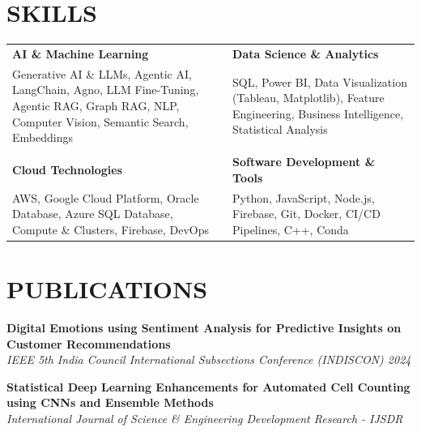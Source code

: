 \documentclass[a4paper,11pt]{article}
\newcommand{\safehref}[2]{#2}
\let\href\safehref
\newcommand{\extlink}{\raisebox{0.2ex}{\scriptsize\faExternalLink*}}
\begin{document}
\section*{SKILLS}
\setlength{\tabcolsep}{10pt}
\renewcommand{\arraystretch}{1.0}
\begin{tabularx}{\textwidth}{@{}>{\RaggedRight\arraybackslash}X >{\RaggedRight\arraybackslash}X@{}}
  \textbf{AI \& Machine Learning} & \textbf{Data Science \& Analytics} \\
  Generative AI \& LLMs, Agentic AI, LangChain, Agno, LLM Fine-Tuning, Agentic RAG, Graph RAG, NLP, Computer Vision, Semantic Search, Embeddings &
  SQL, Power BI, Data Visualization (Tableau, Matplotlib), Feature Engineering, Business Intelligence, Statistical Analysis \\
  \\[-3pt]
  \textbf{Cloud Technologies} & \textbf{Software Development \& Tools} \\
  AWS, Google Cloud Platform, Oracle Database, Azure SQL Database, Compute \& Clusters, Firebase, DevOps &
  Python, JavaScript, Node.js, Firebase, Git, Docker, CI/CD Pipelines, C++, Conda \\
\end{tabularx}

\section*{PUBLICATIONS}
\sloppy
\noindent\textbf{\href{https://example.com}{Digital Emotions using Sentiment Analysis for Predictive Insights on Customer Recommendations\ \extlink}}\\
\textit{IEEE 5th India Council International Subsections Conference (INDISCON) 2024}

\vspace{0.2cm}
\noindent\textbf{\href{https://example.com}{Statistical Deep Learning Enhancements for Automated Cell Counting using CNNs and Ensemble Methods\ \extlink}}\\
\textit{International Journal of Science \& Engineering Development Research - IJSDR}
\fussy

\end{document}
